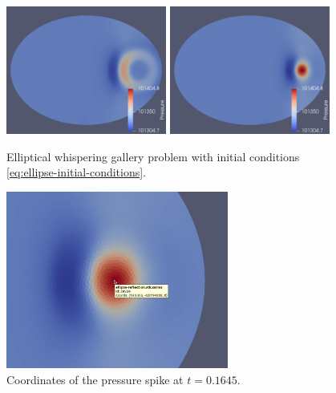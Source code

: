 \begin{figure}[p]
{} \\[2em]
 {
	\includegraphics[width=0.47\textwidth]{ellipset015.png}
} \hfill
{} {
	\includegraphics[width=0.47\textwidth]{ellipset01645.png}
}
\caption{Elliptical whispering gallery problem with initial conditions
\eqref{eq:ellipse-initial-conditions}.}
\label{fig:ellipse-simulation}
\end{figure}

\begin{figure}[p]
\centering
\includegraphics[width=0.65\textwidth]{ellipseF2.png}
\caption{Coordinates of the pressure spike at $t = 0.1645$.}
\label{fig:ellipse-F2}
\end{figure}

